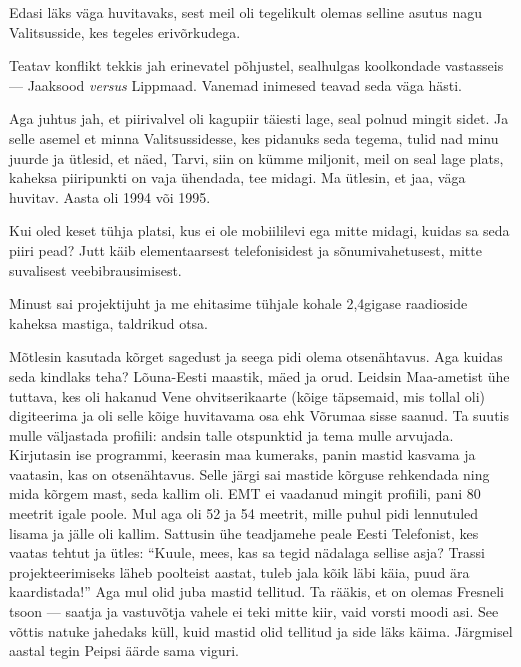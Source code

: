 Edasi läks väga huvitavaks, sest meil oli tegelikult olemas selline asutus nagu 
Valitsusside, kes tegeles erivõrkudega.


Teatav konflikt tekkis jah erinevatel põhjustel, sealhulgas 
koolkondade vastasseis --- Jaaksood \emph{versus} Lippmaad. Vanemad inimesed 
teavad seda väga hästi.

Aga juhtus jah, et piirivalvel oli kagupiir täiesti lage, 
seal polnud mingit sidet. Ja selle asemel et minna 
Valitsussidesse, kes pidanuks seda tegema, tulid nad minu juurde ja ütlesid, 
et näed, Tarvi, siin on kümme miljonit, meil on seal lage 
plats, kaheksa piiripunkti on vaja ühendada, tee midagi. Ma ütlesin, et jaa, väga huvitav. Aasta oli 1994 või 1995.


Kui oled keset tühja platsi, kus ei ole 
mobiililevi ega mitte midagi, kuidas sa seda piiri pead? Jutt käib elementaarsest telefonisidest ja sõnumivahetusest, mitte suvalisest veebibrausimisest.

Minust sai projektijuht ja me ehitasime tühjale kohale 2,4gigase raadioside
kaheksa mastiga, taldrikud otsa.


Mõtlesin kasutada 
kõrget sagedust ja seega pidi olema otsenähtavus. Aga kuidas seda 
kindlaks teha? Lõuna-Eesti maastik, mäed ja orud. Leidsin 
Maa-ametist ühe tuttava, kes oli hakanud 
Vene ohvitserikaarte (kõige täpsemaid, mis tollal oli) digiteerima ja oli 
selle kõige huvitavama osa ehk Võrumaa sisse saanud. Ta suutis mulle 
väljastada profiili: andsin talle otspunktid ja tema mulle arvujada. Kirjutasin ise programmi, keerasin maa kumeraks, panin mastid kasvama ja 
vaatasin, kas on otsenähtavus. Selle järgi sai mastide kõrguse 
rehkendada ning mida kõrgem mast, seda kallim oli. 
EMT ei 
vaadanud mingit profiili, pani 80 meetrit igale poole. Mul aga oli 
52 ja 54 meetrit, mille puhul pidi 
lennutuled lisama ja jälle oli kallim. Sattusin ühe teadjamehe peale 
Eesti Telefonist, kes vaatas tehtut ja ütles: 
\enquote{Kuule, mees, kas sa tegid nädalaga sellise asja? Trassi projekteerimiseks 
läheb poolteist aastat, tuleb jala kõik läbi käia, puud ära kaardistada!} Aga 
mul olid juba mastid tellitud. Ta rääkis, et on olemas Fresneli tsoon --- 
saatja ja vastuvõtja vahele ei teki mitte kiir, vaid vorsti moodi 
asi. See võttis natuke jahedaks 
küll, kuid mastid olid tellitud ja side läks käima. Järgmisel aastal tegin Peipsi 
äärde sama viguri. 

